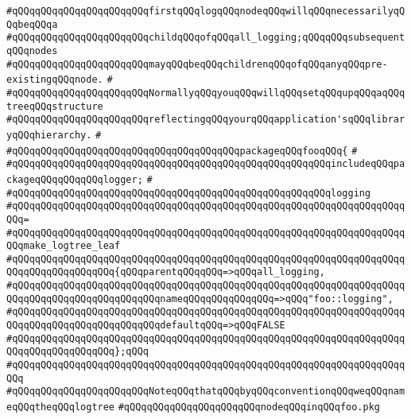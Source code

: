 \verb|#qQQqqQQqqQQqqQQqqQQqqQQqfirstqQQqlogqQQqnodeqQQqwillqQQqnecessarilyqQQqbeqQQqa|\newline
\verb|#qQQqqQQqqQQqqQQqqQQqqQQqchildqQQqofqQQqall_logging;qQQqqQQqsubsequentqQQqnodes|\newline
\verb|#qQQqqQQqqQQqqQQqqQQqqQQqmayqQQqbeqQQqchildrenqQQqofqQQqanyqQQqpre-existingqQQqnode.|\newline
\verb|#|\newline
\verb|#qQQqqQQqqQQqqQQqqQQqqQQqNormallyqQQqyouqQQqwillqQQqsetqQQqupqQQqaqQQqtreeqQQqstructure|\newline
\verb|#qQQqqQQqqQQqqQQqqQQqqQQqreflectingqQQqyourqQQqapplication'sqQQqlibraryqQQqhierarchy.|\newline
\verb|#|\newline
\verb|#qQQqqQQqqQQqqQQqqQQqqQQqqQQqqQQqqQQqqQQqpackageqQQqfooqQQq{|\newline
\verb|#|\newline
\verb|#qQQqqQQqqQQqqQQqqQQqqQQqqQQqqQQqqQQqqQQqqQQqqQQqqQQqqQQqincludeqQQqpackageqQQqqQQqqQQqlogger;|\newline
\verb|#|\newline
\verb|#qQQqqQQqqQQqqQQqqQQqqQQqqQQqqQQqqQQqqQQqqQQqqQQqqQQqqQQqlogging|\newline
\verb|#qQQqqQQqqQQqqQQqqQQqqQQqqQQqqQQqqQQqqQQqqQQqqQQqqQQqqQQqqQQqqQQqqQQqqQQq=|\newline
\verb|#qQQqqQQqqQQqqQQqqQQqqQQqqQQqqQQqqQQqqQQqqQQqqQQqqQQqqQQqqQQqqQQqqQQqqQQqmake_logtree_leaf|\newline
\verb|#qQQqqQQqqQQqqQQqqQQqqQQqqQQqqQQqqQQqqQQqqQQqqQQqqQQqqQQqqQQqqQQqqQQqqQQqqQQqqQQqqQQqqQQq{qQQqparentqQQqqQQq=>qQQqall_logging,|\newline
\verb|#qQQqqQQqqQQqqQQqqQQqqQQqqQQqqQQqqQQqqQQqqQQqqQQqqQQqqQQqqQQqqQQqqQQqqQQqqQQqqQQqqQQqqQQqqQQqqQQqnameqQQqqQQqqQQqqQQq=>qQQq"foo::logging",|\newline
\verb|#qQQqqQQqqQQqqQQqqQQqqQQqqQQqqQQqqQQqqQQqqQQqqQQqqQQqqQQqqQQqqQQqqQQqqQQqqQQqqQQqqQQqqQQqqQQqqQQqdefaultqQQq=>qQQqFALSE|\newline
\verb|#qQQqqQQqqQQqqQQqqQQqqQQqqQQqqQQqqQQqqQQqqQQqqQQqqQQqqQQqqQQqqQQqqQQqqQQqqQQqqQQqqQQqqQQq};qQQq|\newline
\verb|#qQQqqQQqqQQqqQQqqQQqqQQqqQQqqQQqqQQqqQQqqQQqqQQqqQQqqQQqqQQqqQQqqQQqqQQq|\newline
\verb|#qQQqqQQqqQQqqQQqqQQqqQQqNoteqQQqthatqQQqbyqQQqconventionqQQqweqQQqnameqQQqtheqQQqlogtree|\newline
\verb|#qQQqqQQqqQQqqQQqqQQqqQQqnodeqQQqinqQQqfoo.pkg|\newline
